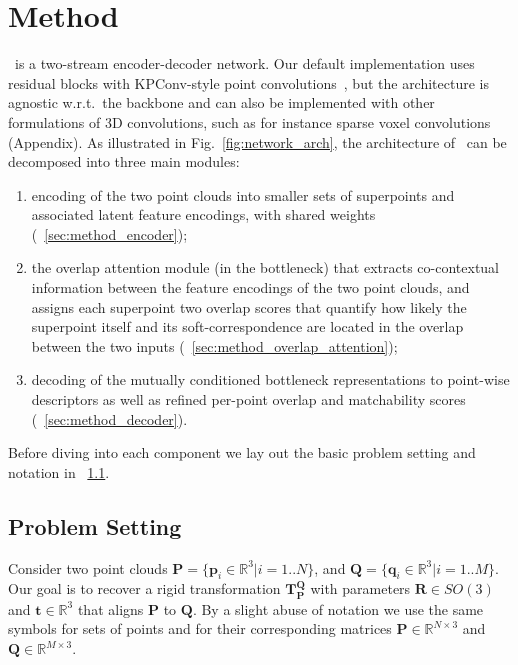 \section{Method}
\label{sec:method}

\acro\ is a two-stream encoder-decoder network. Our default implementation uses residual blocks with KPConv-style point convolutions~\cite{thomas2019kpconv}, but the architecture is agnostic w.r.t.\ the backbone and can also be implemented with other formulations of 3D convolutions, such as for instance sparse voxel convolutions~\cite{choy2019Minkowski} (\cf Appendix). 
As illustrated in Fig.~\ref{fig:network_arch}, the architecture of \acro\ can be decomposed into three main modules:
\begin{enumerate}
\item encoding of the two point clouds into smaller sets of superpoints and associated latent feature encodings, with shared weights (~\cref{sec:method_encoder});
\item the overlap attention module (in the bottleneck) that extracts co-contextual information between the feature encodings of the two point clouds, and assigns each superpoint two overlap scores that quantify how likely the superpoint itself and its soft-correspondence are located in the overlap between the two inputs (~\cref{sec:method_overlap_attention}); 
\item decoding of the mutually conditioned bottleneck representations to point-wise descriptors as well as refined per-point overlap and matchability scores (~\cref{sec:method_decoder}).
\end{enumerate}
Before diving into each component we lay out the basic problem setting and notation in ~\cref{sec:method_notation}. %
\subsection{Problem Setting}
\label{sec:method_notation}

Consider two point clouds $\mathbf{P}= \{\mathbf{p}_i \in \mathbb{R}^3| i = 1..N\}$, and $\mathbf{Q}= \{\mathbf{q}_i \in \mathbb{R}^3| i = 1..M\}$.
Our goal is to recover a rigid transformation $\mathbf{T}_\mathbf{P}^\mathbf{Q}$ with parameters $\mathbf{R} \in SO(3)$ and $\mathbf{t} \in \mathbb{R}^3$ that aligns %
$\mathbf{P}$ to $\mathbf{Q}$.
By a slight abuse of notation we use the same symbols for sets of points and for their corresponding matrices $\mathbf{P}\in\mathbb{R}^{N\times 3}$ and $\mathbf{Q}\in\mathbb{R}^{M\times 3}$.

